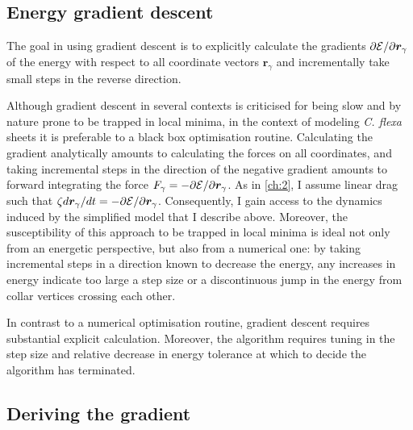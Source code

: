 % 
% 
% 
% 
% 

\subsection{Energy gradient descent}

The goal in using gradient descent is to explicitly calculate the gradients $\partial \mathcal{E} / \partial \bm{r}_\gamma$ of the energy with respect to all coordinate vectors $\bm{r}_\gamma$ and incrementally take small steps in the reverse direction. 

Although gradient descent in several contexts is criticised for being slow and by nature prone to be trapped in local minima, in the context of modeling \textit{C. flexa} sheets it is preferable to a black box optimisation routine. 
Calculating the gradient analytically amounts to calculating the forces on all coordinates, and taking incremental steps in the direction of the negative gradient amounts to forward integrating the force $F_\gamma = - \partial\mathcal{E}/\partial\bm{r}_\gamma$. 
As in \cref{ch:2}, I assume linear drag such that $\zeta d\bm{r}_\gamma/dt = -\partial\mathcal{E}/\partial\bm{r}_\gamma$. 
Consequently, I gain access to the dynamics induced by the simplified model that I describe above. 
Moreover, the susceptibility of this approach to be trapped in local minima is ideal not only from an energetic perspective, but also from a numerical one: by taking incremental steps in a direction known to decrease the energy, any increases in energy indicate too large a step size or a discontinuous jump in the energy from collar vertices crossing each other.

In contrast to a numerical optimisation routine, gradient descent requires substantial explicit calculation. Moreover, the algorithm requires tuning in the step size and relative decrease in energy tolerance at which to decide the algorithm has terminated. 

\subsection{Deriving the gradient}

